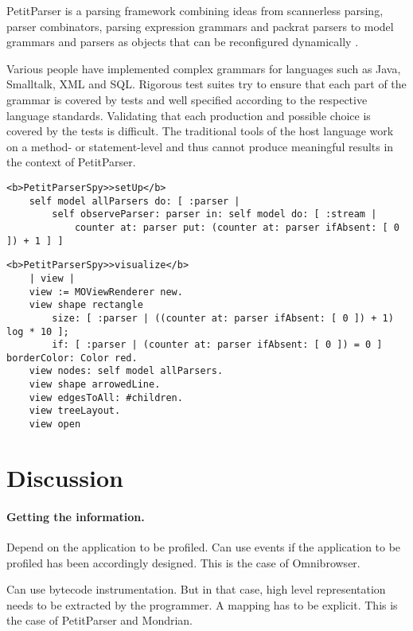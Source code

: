 \documentclass[runningheads]{llncs}
\newcommand{\seclabel}[1]{\label{sec:#1}}
\begin{document}
PetitParser is a parsing framework combining ideas from scannerless parsing, parser combinators, parsing expression grammars and packrat parsers to model grammars and parsers as objects that can be reconfigured dynamically \cite{Reng10c}.

Various people have implemented complex grammars for languages such as Java, Smalltalk, XML and SQL. Rigorous test suites try to ensure that each part of the grammar is covered by tests and well specified according to the respective language standards. Validating that each production and possible choice is covered by the tests is difficult. The traditional tools of the host language work on a method- or statement-level and thus cannot produce meaningful results in the context of PetitParser.

\begin{lstlisting}
<b>PetitParserSpy>>setUp</b>
	self model allParsers do: [ :parser |
		self observeParser: parser in: self model do: [ :stream |
			counter at: parser put: (counter at: parser ifAbsent: [ 0 ]) + 1 ] ]
\end{lstlisting}

\begin{lstlisting}
<b>PetitParserSpy>>visualize</b>
	| view |
	view := MOViewRenderer new.
	view shape rectangle 
		size: [ :parser | ((counter at: parser ifAbsent: [ 0 ]) + 1) log * 10 ];
		if: [ :parser | (counter at: parser ifAbsent: [ 0 ]) = 0 ] borderColor: Color red.
	view nodes: self model allParsers.
	view shape arrowedLine.
	view edgesToAll: #children.
	view treeLayout.
	view open
\end{lstlisting}



\section{Discussion}\seclabel{discussion}

\paragraph{Getting the information.} 
Depend on the application to be profiled. 
Can use events if the application to be profiled has been accordingly designed. This is the case of Omnibrowser. 

Can use bytecode instrumentation. But in that case, high level representation needs to be extracted by the programmer. A mapping has to be explicit. This is the case of PetitParser and Mondrian.
\end{document}
